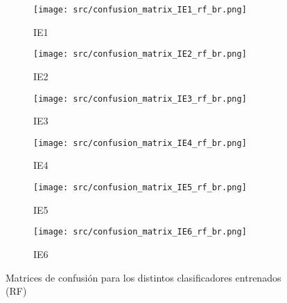 \begin{figure}[H]
	\centering
	\begin{subfigure}[b]{0.3\textwidth}
		\centering
		\texttt{[image: src/confusion\_matrix\_IE1\_rf\_br.png]}
		\caption{IE1}
	\end{subfigure}
	\hfill
	\begin{subfigure}[b]{0.3\textwidth}
		\centering
		\texttt{[image: src/confusion\_matrix\_IE2\_rf\_br.png]}
		\caption{IE2}
	\end{subfigure}
	\hfill
	\begin{subfigure}[b]{0.3\textwidth}
		\centering
		\texttt{[image: src/confusion\_matrix\_IE3\_rf\_br.png]}
		\caption{IE3}
	\end{subfigure}
	\hfill
	\begin{subfigure}[b]{0.3\textwidth}
		\centering
		\texttt{[image: src/confusion\_matrix\_IE4\_rf\_br.png]}
		\caption{IE4}
	\end{subfigure}
	\hfill
	\begin{subfigure}[b]{0.3\textwidth}
		\centering
		\texttt{[image: src/confusion\_matrix\_IE5\_rf\_br.png]}
		\caption{IE5}
	\end{subfigure}
	\hfill
	\begin{subfigure}[b]{0.3\textwidth}
		\centering
		\texttt{[image: src/confusion\_matrix\_IE6\_rf\_br.png]}
		\caption{IE6}
	\end{subfigure}
	\caption{Matrices de confusión para los distintos clasificadores entrenados (RF)}
	\label{fig:ml_conf_matrix_rf}
\end{figure}
\pagebreak
